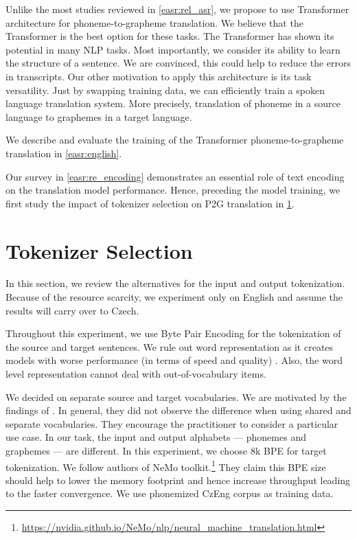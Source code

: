 Unlike the most studies reviewed in \cref{easr:rel_asr}, we propose to use Transformer architecture for phoneme-to-grapheme translation. We believe that the Transformer is the best option for these tasks. The Transformer has shown its potential in many NLP tasks. Most importantly, we consider its ability to learn the structure of a sentence. We are convinced, this could help to reduce the errors in transcripts. Our other motivation to apply this architecture is its task versatility. Just by swapping training data, we can efficiently train a spoken language translation system. More precisely, translation of phoneme in a source language to graphemes in a target language. 

We describe and evaluate the training of the Transformer phoneme-to-grapheme translation in \cref{easr:english}.

Our survey in \cref{easr:re_encoding} demonstrates an essential role of text encoding on the translation model performance. Hence, preceding the model training, we first study the impact of tokenizer selection on P2G translation in \cref{easr:tokenizer}.


\section{Tokenizer Selection}
\label{easr:tokenizer}

In this section, we review the alternatives for the input and output tokenization. Because of the resource scarcity, we experiment only on English and assume the results will carry over to Czech. 

Throughout this experiment, we use Byte Pair Encoding for the tokenization of the source and target sentences. We rule out word representation as it creates models with worse performance (in terms of speed and quality) . Also, the word level representation cannot deal with out-of-vocabulary items.

We decided on separate source and target vocabularies. We are motivated by the findings of . In general, they did not observe the difference when using shared and separate vocabularies. They encourage the practitioner to consider a particular use case. In our task, the input and output alphabets --- phonemes and graphemes --- are different. In this experiment, we choose 8k BPE for target tokenization. We follow authors of NeMo toolkit.\footnote{\url{https://nvidia.github.io/NeMo/nlp/neural_machine_translation.html}} They claim this BPE size should help to lower the memory footprint and hence increase throughput leading to the faster convergence. We use phonemized CzEng corpus as training data.

